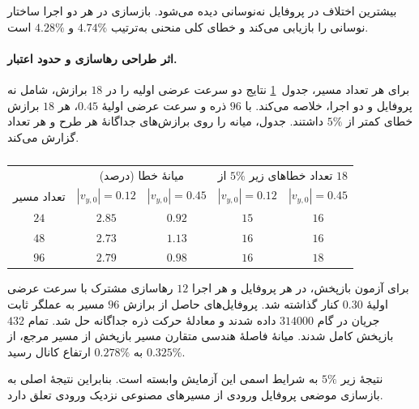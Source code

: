 بیشترین اختلاف در پروفایل نه‌نوسانی دیده می‌شود. بازسازی در هر دو اجرا ساختار نوسانی را بازیابی می‌کند و خطای کلی منحنی به‌ترتیب $4.74\%$ و $4.28\%$ است.

\clearpage
\paragraph{اثر طراحی رهاسازی و حدود اعتبار.}
برای هر تعداد مسیر، جدول~\ref{tab:results-inverse-geometry} نتایج دو سرعت عرضی اولیه را در $18$ برازش، شامل نه پروفایل و دو اجرا، خلاصه می‌کند.
با $96$ ذره و سرعت عرضی اولیهٔ $0.45$، هر $18$ برازش خطای کمتر از $5\%$ داشتند. جدول، میانه را روی برازش‌های جداگانهٔ هر طرح و هر تعداد گزارش می‌کند.

\begin{table}[!ht]
\centering
\small
\caption[اثر تعداد مسیرها و سرعت عرضی اولیه بر خطای نسبی پروفایل ورودی.]{}
\label{tab:results-inverse-geometry}
\begin{tabular}{@{}ccccc@{}}
\hline
 & \multicolumn{2}{c}{میانهٔ خطا (درصد)} & \multicolumn{2}{c}{تعداد خطاهای زیر $5\%$ از $18$} \\
تعداد مسیر & $|v_{y,0}|=0.12$ & $|v_{y,0}|=0.45$ & $|v_{y,0}|=0.12$ & $|v_{y,0}|=0.45$ \\
\hline
$24$ & $2.85$ & $0.92$ & $15$ & $16$ \\
$48$ & $2.73$ & $1.13$ & $16$ & $16$ \\
$96$ & $2.79$ & $0.98$ & $16$ & $18$ \\
\hline
\end{tabular}
\end{table}

برای آزمون بازپخش، در هر پروفایل و هر اجرا $12$ رهاسازی مشترک با سرعت عرضی اولیهٔ $0.30$ کنار گذاشته شد.
پروفایل‌های حاصل از برازش $96$ مسیر به عملگر ثابت جریان در گام $314000$ داده شدند و معادلهٔ حرکت ذره جداگانه حل شد.
تمام $432$ بازپخش کامل شدند.
میانهٔ فاصلهٔ هندسی متقارن مسیر بازپخش از مسیر مرجع، از $0.325\%$ به $0.278\%$ ارتفاع کانال رسید.

نتیجهٔ زیر $5\%$ به شرایط اسمی این آزمایش وابسته است.
بنابراین نتیجهٔ اصلی به بازسازی موضعی پروفایل ورودی از مسیرهای مصنوعی نزدیک ورودی تعلق دارد.

